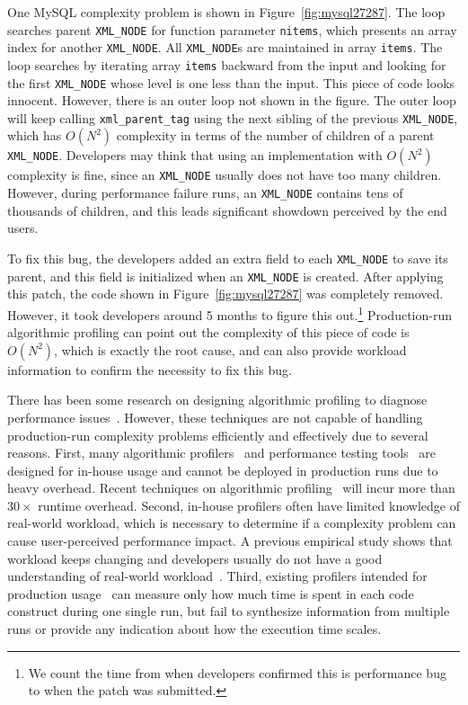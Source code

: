 


One MySQL complexity problem is shown in Figure~\ref{fig:mysql27287}.
The loop searches parent \texttt{XML\_NODE} for function parameter \texttt{nitems},
which presents an array index for another \texttt{XML\_NODE}.
All \texttt{XML\_NODE}s are maintained in array \texttt{items}.
The loop searches by iterating array \texttt{items}
backward from the input and looking for the first \texttt{XML\_NODE}
whose level is one less than the input.
This piece of code looks innocent.
However, there is an outer loop not shown in the figure.
The outer loop will keep calling \texttt{xml\_parent\_tag} using
the next sibling of the previous \texttt{XML\_NODE},
which has $O(N^2)$ complexity in terms of the number of children of a parent \texttt{XML\_NODE}.
Developers may think that using an implementation with $O(N^2)$ complexity is fine,
since an \texttt{XML\_NODE} usually does not have too many children.
However, during performance failure runs,
an \texttt{XML\_NODE} contains tens of thousands of children,
and this leads significant showdown perceived by the end users.

To fix this bug, the developers added an extra field to each \texttt{XML\_NODE} to save its parent,
and this field is initialized when an \texttt{XML\_NODE} is created.
After applying this patch, the code shown in Figure~\ref{fig:mysql27287} was completely removed.
However, it took developers around 5 months to figure this
out.\footnote{We count the time from when developers confirmed this is performance bug
to when the patch was submitted.}
Production-run algorithmic profiling 
can point out the complexity of this piece of code is $O(N^2)$, 
which is exactly the root cause, 
and can also provide workload information 
to confirm the necessity to fix this bug.


There has been some research on designing algorithmic profiling 
to diagnose performance issues~\cite{gprof,oprofile}. 
However, these techniques
are not capable of handling production-run complexity problems
efficiently and effectively due to several reasons. 
First, many algorithmic profilers~\cite{?} and performance 
testing tools~\cite{?} are designed for in-house usage and cannot be 
deployed in production runs due to  heavy overhead. 
Recent techniques on algorithmic 
profiling~\cite{Aprof1,Aprof2,AlgoProf} will incur more than $30\times$ runtime overhead.
Second, in-house profilers often have limited knowledge of real-world workload, which is necessary 
to determine if a complexity problem can cause user-perceived performance 
impact. A previous empirical study shows that workload keeps changing and 
developers usually do not have a good understanding of  real-world workload~\citep{PerfBug}.  
Third, existing profilers intended for production usage~\cite{?}
can measure only how much time 
is spent in each code construct during one single run,
but fail to synthesize information from multiple runs
or provide any indication about how the execution time scales.



